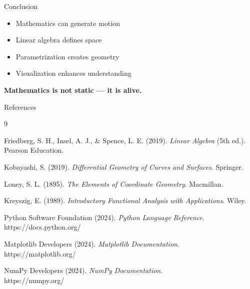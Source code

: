 \documentclass{beamer}
\begin{document}
\begin{frame}{Conclusion}
\begin{itemize}
\item Mathematics can generate motion
\item Linear algebra defines space
\item Parametrization creates geometry
\item Visualization enhances understanding
\end{itemize}

\vspace{0.5cm}
\centering
\Large{\textbf{Mathematics is not static — it is alive.}}
\end{frame}

\begin{frame}[allowframebreaks]{References}

\footnotesize

\begin{thebibliography}{9}

Friedberg, S. H., Insel, A. J., \& Spence, L. E. (2019). 
\textit{Linear Algebra} (5th ed.). Pearson Education.

Kobayashi, S. (2019). 
\textit{Differential Geometry of Curves and Surfaces}. Springer.

Loney, S. L. (1895). 
\textit{The Elements of Coordinate Geometry}. Macmillan.

Kreyszig, E. (1989). 
\textit{Introductory Functional Analysis with Applications}. Wiley.

Python Software Foundation (2024). 
\textit{Python Language Reference}.\\
https://docs.python.org/

Matplotlib Developers (2024). 
\textit{Matplotlib Documentation}.\\
https://matplotlib.org/

NumPy Developers (2024). 
\textit{NumPy Documentation}.\\
https://numpy.org/

\end{thebibliography}

\end{frame}
\end{document}
